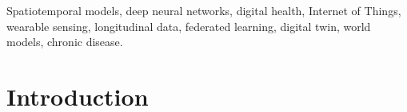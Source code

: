\documentclass[journal]{IEEEtran}
\providecommand{\Description}[1]{}
\begin{document}
\begin{IEEEkeywords}
Spatiotemporal models, deep neural networks, digital health, Internet of Things, wearable sensing, longitudinal data, federated learning, digital twin, world models, chronic disease.
\end{IEEEkeywords}




\section{Introduction}
\label{sec:intro}
\end{document}
